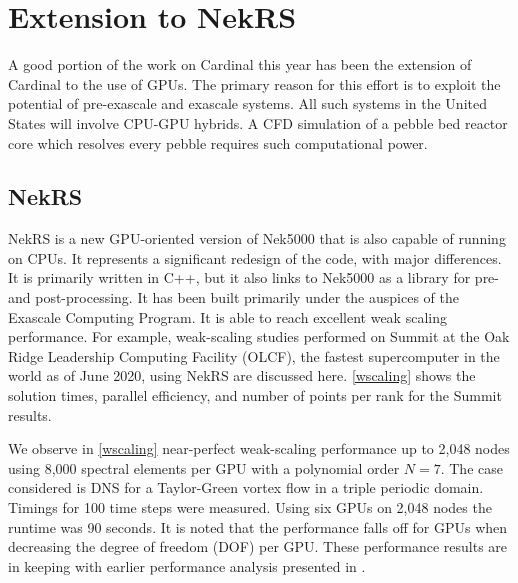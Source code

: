 \section{Extension to NekRS}
\label{s:nrs}

A good portion of the work on Cardinal this year has been the extension of Cardinal to the use of GPUs. The primary reason for this effort is to exploit the potential of pre-exascale and exascale systems.
All such systems in the United States will involve CPU-GPU hybrids. 
A CFD simulation of a pebble bed reactor core which resolves every pebble requires such computational power.

\subsection{NekRS}

NekRS is a new GPU-oriented version of Nek5000 that is also capable of running on CPUs.
It represents a significant redesign of the code, with major differences.
It is primarily written in C++, but it also links to Nek5000 as a library for pre- and post-processing.
It has been built primarily under the auspices of the Exascale Computing Program.
It is able to reach excellent weak scaling performance.
For example, weak-scaling studies performed on Summit at the Oak Ridge Leadership Computing Facility (OLCF), the fastest supercomputer in the world as of June 2020, using NekRS are discussed here.
\autoref{wscaling} shows the solution times, parallel efficiency, and number of points per rank for the Summit results.

We observe in \autoref{wscaling} near-perfect weak-scaling performance up to 2,048 nodes using 8,000 spectral elements per GPU with a polynomial order  $N=7$.
The case considered is DNS for a Taylor-Green vortex flow in a triple periodic domain. 
Timings for 100 time steps were measured.
Using six GPUs on 2,048 nodes the runtime was 90 seconds. 
It is noted that the performance falls off for GPUs when decreasing the degree of freedom (DOF) per GPU.  
These performance results are in keeping with earlier performance analysis presented in \cite{fischer15,min2015a}.

